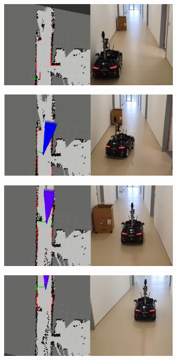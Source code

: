 \begin{minipage}{\textwidth}
    \centering
    \includegraphics[width=0.65\textwidth]{figures/raw/jpeg/local_planner_real_test_joined_straight_traj_1_static_obj_1.jpg}
    
    \vspace{0.5cm}
    \centering
    \includegraphics[width=0.65\textwidth]{figures/raw/jpeg/local_planner_real_test_joined_straight_traj_1_static_obj_2.jpg}
    
    \vspace{0.5cm}
    \centering
    \includegraphics[width=0.65\textwidth]{figures/raw/jpeg/local_planner_real_test_joined_straight_traj_1_static_obj_3.jpg}
    
    \vspace{0.5cm}
    \centering
    \includegraphics[width=0.65\textwidth]{figures/raw/jpeg/local_planner_real_test_joined_straight_traj_1_static_obj_4.jpg}
    
    \label{local_planner_real_test_joined_straight_traj_1_static_obj}
\end{minipage}

